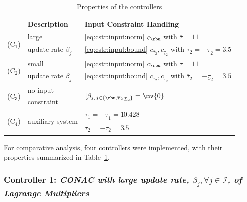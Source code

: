 \documentclass[journal]{IEEEtran}
\begin{document}
\begin{table}[t]
    \renewcommand{\arraystretch}{1.3}
    \caption{Properties of the controllers}
    \label{table:controller}
    \centering
    \begin{tabular}{c l l}
    \hline
        &\bf{Description}&\bf{Input Constraint Handling}\\
    \hline
    \hline
        \multirow{2}{*}{(C$_1$)}&large&\eqref{eq:cstr:input:norm} $c_{\rbu}$ with $\overline{\tau}=11$ \\
        &  update rate $\beta_j$ &\eqref{eq:cstr:input:bound} $c_{\overline\tau_2}, c_{\underline\tau_2}$ with $\overline{\tau}_2=-\underline{\tau}_2=3.5$ \\
    \hline
        \multirow{2}{*}{(C$_2$)}&small&\eqref{eq:cstr:input:norm} $c_{\rbu}$ with $\overline{\tau}=11$ \\
        &  update rate $\beta_j$ &\eqref{eq:cstr:input:bound} $c_{\overline\tau_2}, c_{\underline\tau_2}$ with $\overline{\tau}_2=-\underline{\tau}_2=3.5$ \\
    \hline
        \multirow{2}{*}{(C$_3$)}&no input& \multirow{2}{*}{$[\beta_j]_{j\in\{\rbu,\overline{\tau}_2,\underline{\tau}_2\}}=\mv{0}$} \\
        & constraint &  \\
    \hline
        \multirow{2}{*}{(C$_4$)}&\multirow{2}{*}{auxiliary system} & $\overline{\tau}_1=-\underline{\tau}_1=10.428$ \\
        &  & $\overline{\tau_2}=-\underline{\tau_2}=3.5$ \\    
    \hline
    \end{tabular}
    \label{table:controllers}
\end{table}


\hfill

For comparative analysis, four controllers were implemented, with their properties summarized in Table~\ref{table:controllers}.

\subsubsection*{Controller 1:  \textit{CONAC with large update rate, $\beta_j,\forall j\in\mathcal{I}$, of Lagrange Multipliers}}
\end{document}
